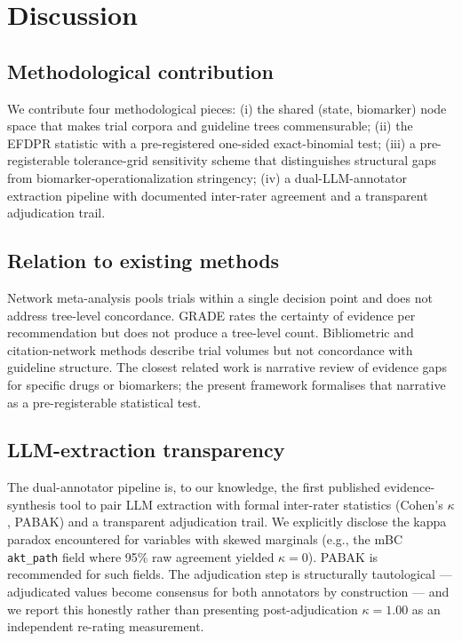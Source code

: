 \documentclass[11pt,a4paper]{article}
\begin{document}
\section{Discussion}\label{sec:discussion}

\subsection{Methodological contribution}
We contribute four methodological pieces: (i) the shared (state, biomarker) node space that makes trial corpora and guideline trees commensurable; (ii) the EFDPR statistic with a pre-registered one-sided exact-binomial test; (iii) a pre-registerable tolerance-grid sensitivity scheme that distinguishes structural gaps from biomarker-operationalization stringency; (iv) a dual-LLM-annotator extraction pipeline with documented inter-rater agreement and a transparent adjudication trail.

\subsection{Relation to existing methods}
Network meta-analysis pools trials within a single decision point and does not address tree-level concordance.\citep{rouse2017nma} GRADE rates the certainty of evidence per recommendation but does not produce a tree-level count.\citep{guyatt2008grade} Bibliometric and citation-network methods describe trial volumes but not concordance with guideline structure.\citep{priem2022openalex} The closest related work is narrative review of evidence gaps for specific drugs or biomarkers; the present framework formalises that narrative as a pre-registerable statistical test.

\subsection{LLM-extraction transparency}
The dual-annotator pipeline is, to our knowledge, the first published evidence-synthesis tool to pair LLM extraction with formal inter-rater statistics (Cohen's $\kappa$, PABAK) and a transparent adjudication trail. We explicitly disclose the kappa paradox encountered for variables with skewed marginals (e.g., the mBC \texttt{akt\_path} field where 95\% raw agreement yielded $\kappa = 0$). PABAK is recommended for such fields. The adjudication step is structurally tautological --- adjudicated values become consensus for both annotators by construction --- and we report this honestly rather than presenting post-adjudication $\kappa = 1.00$ as an independent re-rating measurement.
\end{document}
